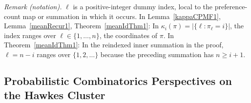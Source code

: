 \documentclass[opre,nonblindrev]{informs3_no_remark}
\newcommand{\tr}{\textcolor{red}}
\begin{document}
\noindent\textit{Remark (notation).} $\ell$ is a positive-integer dummy index, local to the preference-count map or summation in which it occurs. In Lemma~\ref{kappaCPMF1}, Lemma~\ref{meanRecur1}, Theorem~\ref{meanIdThm1}: In $\kappa_i(\pi)=|\{\ell:\pi_\ell=i\}|$, the index ranges over $\ell\in\{1,\dots,n\}$, the coordinates of $\pi$. In Theorem~\ref{meanIdThm1}: In the reindexed inner summation in the proof, $\ell=n-i$ ranges over $\{1,2,\dots\}$ because the preceding summation has $n\geq i+1$.





 







\subsection{Probabilistic Combinatorics Perspectives on the Hawkes Cluster}


\end{document}
